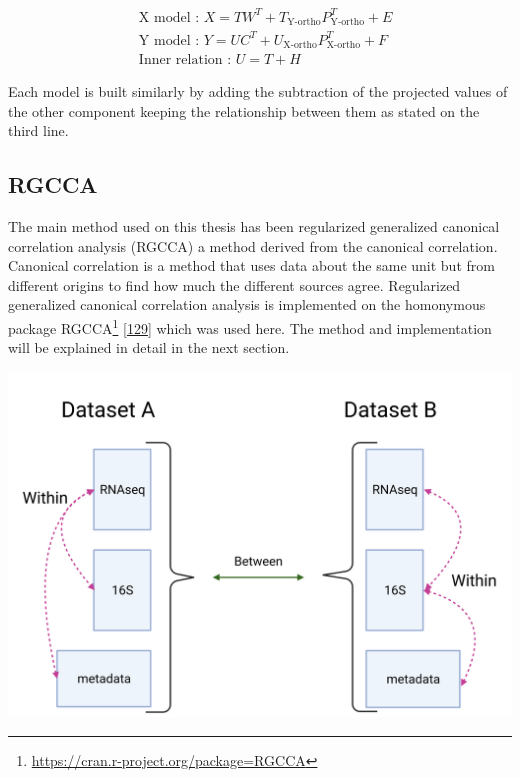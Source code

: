 \documentclass[
  a4paper,
]{book}
\DeclareRobustCommand{\href}[2]{#2\footnote{\url{#1}}}
\let\origfigure\figure
\let\endorigfigure\endfigure
\renewenvironment{figure}[1][2] {
    \expandafter\origfigure\expandafter[!ht]
} {
    \endorigfigure
}
\begin{document}
\[
\begin{aligned}
& \text{X model : } X = TW ^ T + T_{\text{Y-ortho}} P ^ T_{\text{Y-ortho}} + E \\
& \text{Y model : } Y = UC ^ T + U_{\text{X-ortho}} P ^ T_{\text{X-ortho}} + F \\
& \text{Inner relation : } U = T + H
\end{aligned}
\]

Each model is built similarly by adding the subtraction of the projected values of the other component keeping the relationship between them as stated on the third line.

\hypertarget{rgcca}{%
\subsection{RGCCA}\label{rgcca}}

The main method used on this thesis has been regularized generalized canonical correlation analysis (RGCCA) a method derived from the canonical correlation.
Canonical correlation is a method that uses data about the same unit but from different origins to find how much the different sources agree.
Regularized generalized canonical correlation analysis is implemented on the homonymous package \href{https://cran.r-project.org/package=RGCCA}{RGCCA} {[}\protect\hyperlink{ref-tenenhaus2017}{129}{]} which was used here.
The method and implementation will be explained in detail in the next section.

\begin{figure}
\includegraphics[width=1\linewidth]{images/multiomic_datasets} \caption[Multiomic relationships.]{Multiomic relationships on different datasets. Integration methods focus on relationships within datasets. Common relationships between datasets are used as confirmation/validation. Created with BioRender.com}\label{fig:multiomic-datasets}
\end{figure}
\end{document}
